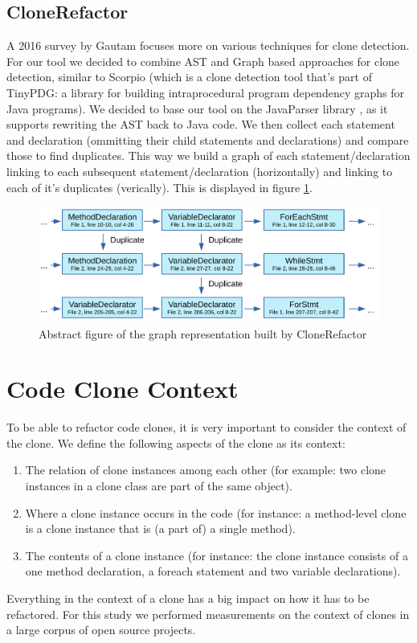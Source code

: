 \documentclass[a4paper]{article}
\begin{document}
\subsection{CloneRefactor}
A 2016 survey by Gautam \cite{gautam2016various} focuses more on various techniques for clone detection. For our tool we decided to combine AST and Graph based approaches for clone detection, similar to Scorpio (which is a clone detection tool that's part of TinyPDG: a library for building intraprocedural program dependency graphs for Java programs). We decided to base our tool on the JavaParser library \cite{tomassetti2017javaparser}, as it supports rewriting the AST back to Java code. We then collect each statement and declaration (ommitting their child statements and declarations) and compare those to find duplicates. This way we build a graph of each statement/declaration linking to each subsequent statement/declaration (horizontally) and linking to each of it's duplicates (verically). This is displayed in figure \ref{fig:clonerefactor}.

\begin{figure}[H]
  \includegraphics[width=1\columnwidth]{img/CodeGraph}
  \caption{Abstract figure of the graph representation built by CloneRefactor}
  \label{fig:clonerefactor}
\end{figure}

\section{Code Clone Context}
To be able to refactor code clones, it is very important to consider the context of the clone. We define the following aspects of the clone as its context:
\begin{enumerate}
  \item The relation of clone instances among each other (for example: two clone instances in a clone class are part of the same object).
  \item Where a clone instance occurs in the code (for instance: a method-level clone is a clone instance that is (a part of) a single method).
  \item The contents of a clone instance (for instance: the clone instance consists of a one method declaration, a foreach statement and two variable declarations).
\end{enumerate}
Everything in the context of a clone has a big impact on how it has to be refactored. For this study we performed measurements on the context of clones in a large corpus of open source projects.
\end{document}
